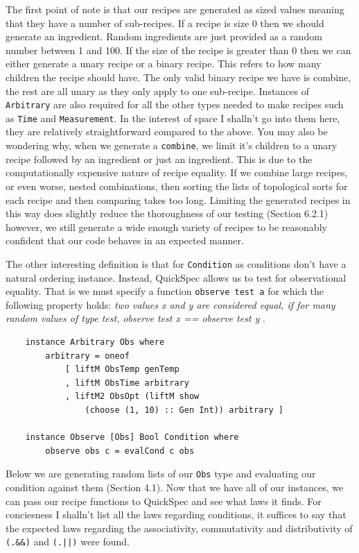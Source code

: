 \documentclass[11pt]{article}
\begin{document}
The first point of note is that our recipes are generated as sized values meaning
that they have a number of sub-recipes. If a recipe is size 0 then we should generate
an ingredient. Random ingredients are just provided as a random number between 1 and 100.
If the size of the recipe is greater than 0 then we can either generate a unary recipe
or a binary recipe. This refers to how many children the recipe should have. The only
valid binary recipe we have is combine, the rest are all unary as they only apply to
one sub-recipe. Instances of \texttt{Arbitrary} are also required for all the other types
needed to make recipes such as \texttt{Time} and \texttt{Measurement}. In the interest
of space I shalln't go into them here, they are relatively straightforward compared to
the above. You may also be wondering why, when we generate a \texttt{combine}, we limit
it's children to a unary recipe followed by an ingredient or just an ingredient. This
is due to the computationally expensive nature of recipe equality. If we combine large
recipes, or even worse, nested combinations, then sorting the lists of topological sorts
for each recipe and then comparing takes too long. Limiting the generated recipes in this
way does slightly reduce the thoroughness of our testing (Section 6.2.1) however, we still
generate a wide enough variety of recipes to be reasonably confident that our code behaves
in an expected manner.

\medbreak

The other interesting definition is that for \texttt{Condition} as conditions don't
have a natural ordering instance. Instead, QuickSpec allows us to test for observational
equality. That is we must specify a function \texttt{observe test a} for which the
following property holds: \textit{two values x and y are considered equal,
if for many random values of type test, observe test x == observe test y} \cite{quickspec-docs}.

\begin{lstlisting}
    instance Arbitrary Obs where
        arbitrary = oneof
            [ liftM ObsTemp genTemp
            , liftM ObsTime arbitrary
            , liftM2 ObsOpt (liftM show
                (choose (1, 10) :: Gen Int)) arbitrary ]

    instance Observe [Obs] Bool Condition where
        observe obs c = evalCond c obs
\end{lstlisting}

Below we are generating random lists of our \texttt{Obs} type and evaluating our
condition against them (Section 4.1). Now that we have all of our instances,
we can pass our recipe functions to QuickSpec and see what laws it finds.
For conciesness I shalln't list all the laws regarding conditions, it suffices
to say that the expected laws regarding the associativity, commutativity and
distributivity of \texttt{(.\&\&)} and \texttt{(.||)} were found.
\end{document}
